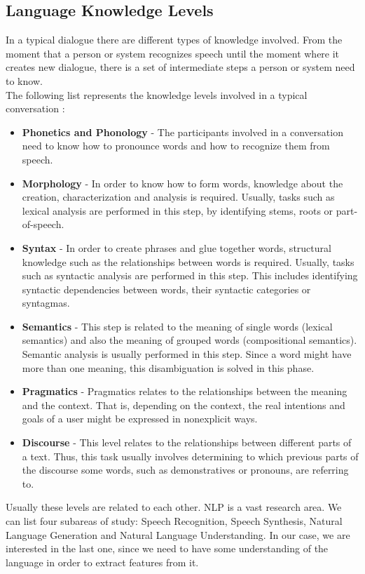 \subsection{Language Knowledge Levels}
In a typical dialogue there are different types of knowledge involved. From the moment that a person or system recognizes speech until the moment where it creates new dialogue, there is a set of intermediate steps a person or system need to know.\\
The following list represents the knowledge levels involved in a typical conversation \citep{Jurafsky2009SLP}:
\begin{itemize}
	\item \textbf{Phonetics and Phonology} - The participants involved in a conversation need to know how to pronounce words and how to recognize them from speech.
    \item \textbf{Morphology} - In order to know how to form words, knowledge about the creation, characterization and analysis is required. Usually, tasks such as lexical analysis are performed in this step, by identifying stems, roots or part-of-speech.
    \item \textbf{Syntax} - In order to create phrases and glue together words, structural knowledge such as the relationships between words is required. Usually, tasks such as syntactic analysis are performed in this step. This includes identifying syntactic dependencies between words, their syntactic categories or syntagmas.
    \item \textbf{Semantics} - This step is related to the meaning of single words (lexical semantics) and also the meaning of grouped words (compositional semantics). Semantic analysis is usually performed in this step. Since a word might have more than one meaning, this disambiguation is solved in this phase.
    \item \textbf{Pragmatics} - Pragmatics relates to the relationships between the meaning and the context. That is, depending on the context, the real intentions and goals of a user might be expressed in nonexplicit ways.
    \item \textbf{Discourse} - This level relates to the relationships between different parts of a text. Thus, this task usually involves determining to which previous parts of the discourse some words, such as demonstratives or pronouns,  are referring to.
\end{itemize}

Usually these levels are related to each other. NLP is a vast research area. We can list four subareas of study: Speech Recognition, Speech Synthesis, Natural Language Generation and Natural Language Understanding. In our case, we are interested in the last one, since we need to have some understanding of the language in order to extract features from it. 

